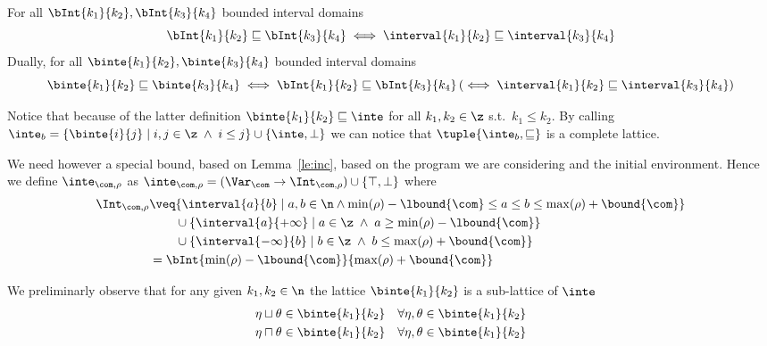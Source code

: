 \begin{definition}
  For all \(\bInt{k_1}{k_2}, \bInt{k_3}{k_4}\) bounded interval
  domains
  \begin{equation*}
    \bInt{k_1}{k_2} \sqsubseteq \bInt{k_3}{k_4} \iff \interval{k_1}{k_2} \sqsubseteq \interval{k_3}{k_4}
  \end{equation*}
  \noindent
  Dually, for all \(\binte{k_1}{k_2}, \binte{k_3}{k_4}\) bounded
  interval domains
  \begin{equation*}
    \binte{k_1}{k_2} \sqsubseteq \binte{k_3}{k_4} \iff \bInt{k_1}{k_2} \sqsubseteq \bInt{k_3}{k_4}
    \left(\iff \interval{k_1}{k_2} \sqsubseteq \interval{k_3}{k_4} \right)
  \end{equation*}
\end{definition}

Notice that because of the latter definition
\(\binte{k_1}{k_2} \sqsubseteq \inte\) for all \(k_1, k_2 \in \z\)
s.t.\ \(k_1 \leq k_2\). By calling
\(\inte_b = \{\binte{i}{j} \mid i,j \in \z \; \land \; i \leq j\} \cup
\{\inte, \bot\}\) we can notice that \(\tuple{\inte_b, \sqsubseteq}\)
is a complete lattice.

\noindent
We need however a special bound, based on Lemma~\ref{le:inc}, based on
the program we are considering and the initial environment.  Hence we
define \(\inte_{\com,\rho}\) as
\({\inte_{\com,\rho} = (\Var_{\com} \to \Int_{\com,\rho}) \cup \{
  \top, \bot \}}\) where
\begin{align*}
  \Int_{\com,\rho} & \veq \{ \interval{a}{b} \mid a, b \in \n \land
                     \min(\rho) - \lbound{\com} \leq a \leq b \leq \max(\rho) + \bound{\com}\} \\
                   & \phantom{\veq} \cup \{\interval{a}{+\infty} \mid a \in\z \; \land \; a \geq \min(\rho) - \lbound{\com}\} \\
                   & \phantom{\veq} \cup \{\interval{-\infty}{b} \mid b \in\z \; \land \; b \leq \max(\rho) + \bound{\com}\} \\
                   & = \bInt{\min(\rho)-\lbound{\com}}{\max(\rho) + \bound{\com}}
\end{align*}

We preliminarly observe that for any given \(k_1,k_2\in\n\) the
lattice \(\binte{k_1}{k_2}\) is a sub-lattice of \(\inte\)
\begin{align*}
  \eta \sqcup \theta & \in \binte{k_1}{k_2} & \forall \eta,\theta \in \binte{k_1}{k_2} \\
  \eta \sqcap \theta & \in \binte{k_1}{k_2} & \forall \eta,\theta \in \binte{k_1}{k_2}
\end{align*}

